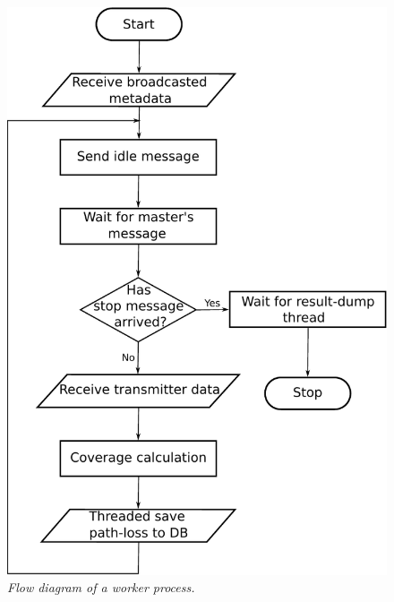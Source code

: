 \begin{figure}
\begin{minipage}[t]{0.49\textwidth}%
\centering

\includegraphics[width=0.9\columnwidth]{04-framework_design_and_implementation/img/worker_process_flow_diagram}

\caption{\textit{\emph{Flow diagram of a worker process.\label{fig:04-Worker_process_flow_diagram}}}}
%
\end{minipage}\hfill{}%
\begin{minipage}[t]{0.49\textwidth}%
\centering


\end{minipage}
\end{figure}

